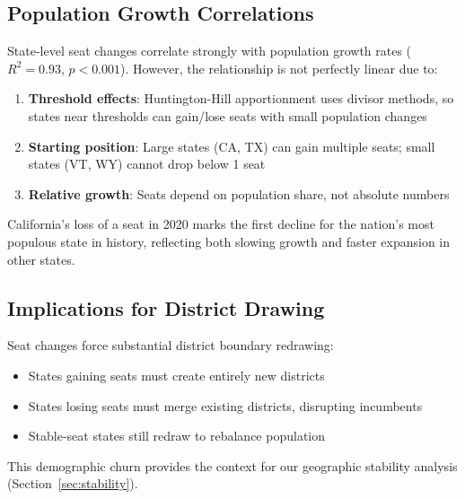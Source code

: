 \subsection{Population Growth Correlations}

State-level seat changes correlate strongly with population growth rates ($R^2 = 0.93$, $p < 0.001$). However, the relationship is not perfectly linear due to:

\begin{enumerate}
    \item \textbf{Threshold effects}: Huntington-Hill apportionment uses divisor methods, so states near thresholds can gain/lose seats with small population changes
    \item \textbf{Starting position}: Large states (CA, TX) can gain multiple seats; small states (VT, WY) cannot drop below 1 seat
    \item \textbf{Relative growth}: Seats depend on population share, not absolute numbers
\end{enumerate}

California's loss of a seat in 2020 marks the first decline for the nation's most populous state in history, reflecting both slowing growth and faster expansion in other states.

\subsection{Implications for District Drawing}

Seat changes force substantial district boundary redrawing:
\begin{itemize}
    \item States gaining seats must create entirely new districts
    \item States losing seats must merge existing districts, disrupting incumbents
    \item Stable-seat states still redraw to rebalance population
\end{itemize}

This demographic churn provides the context for our geographic stability analysis (Section~\ref{sec:stability}).
